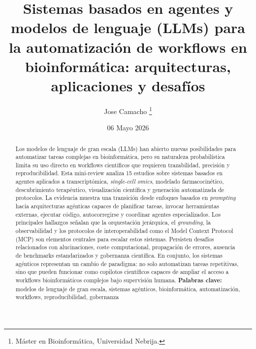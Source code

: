 \documentclass[12pt,a4paper]{article}
\title{Sistemas basados en agentes y modelos de lenguaje (LLMs) para la
automatización de workflows en bioinformática: arquitecturas, aplicaciones y
desafíos}
\author{Jose Camacho%
  \thanks{Máster en Bioinformática, Universidad Nebrija.}}
\date{06 Mayo 2026}
\begin{document}
\maketitle

\begin{abstract}\noindent
Los modelos de lenguaje de gran escala (LLMs) han abierto nuevas posibilidades
para automatizar tareas complejas en bioinformática, pero su naturaleza
probabilística limita su uso directo en workflows científicos que requieren
trazabilidad, precisión y reproducibilidad. Esta mini-review analiza 15 estudios
sobre sistemas basados en agentes aplicados a transcriptómica,
\textit{single-cell omics}, modelado farmacocinético, descubrimiento terapéutico,
visualización científica y generación automatizada de protocolos. La evidencia
muestra una transición desde enfoques basados en \textit{prompting} hacia
arquitecturas agénticas capaces de planificar tareas, invocar herramientas
externas, ejecutar código, autocorregirse y coordinar agentes especializados.
Los principales hallazgos señalan que la
orquestación jerárquica, el \textit{grounding}, la observabilidad y los
protocolos de interoperabilidad como el Model Context Protocol (MCP) son
elementos centrales para escalar estos sistemas. Persisten desafíos
relacionados con alucinaciones, coste computacional, propagación de errores,
ausencia de benchmarks estandarizados y gobernanza científica. En conjunto, los
sistemas agénticos representan un cambio
de paradigma: no solo automatizan tareas repetitivas, sino que pueden funcionar
como copilotos científicos capaces de ampliar el acceso a workflows
bioinformáticos complejos bajo supervisión humana.
\medskip\noindent
\textbf{Palabras clave:} modelos de lenguaje de gran escala, sistemas
agénticos, bioinformática, automatización, workflows, reproducibilidad,
gobernanza
\end{abstract}

\newpage\tableofcontents\newpage







\newpage
\nocite{*}

\end{document}
